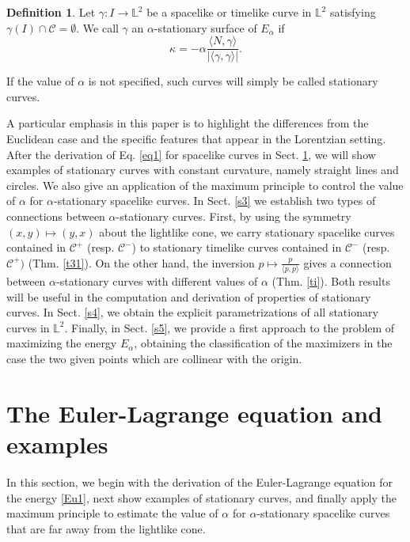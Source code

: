 \documentclass[a4paper,12pt]{amsart}
\theoremstyle{definition}
\newtheorem{definition}[theorem]{Definition}
\def\l{\mathbb L}
\begin{document}
\begin{definition} \label{d1}
Let $\gamma\colon I\to\l^2$ be a spacelike or timelike curve in $\l^2$ satisfying $\gamma(I) \cap \mathcal{C} = \emptyset$. We call $\gamma$ an $\alpha$-stationary surface of $E_\alpha$ if  
\begin{equation}
\kappa=-\alpha \frac{ \langle N,\gamma\rangle}{|\langle \gamma,\gamma\rangle|}. \label{eq1}
\end{equation}
\end{definition}
 
If the value of $\alpha$ is not specified, such curves will simply be called stationary curves.

A particular emphasis in this paper is to highlight the differences from the Euclidean case and the specific features that appear in the Lorentzian setting. After the derivation of Eq. \eqref{eq1} for spacelike curves in Sect. 
\ref{s2}, we will show examples of stationary curves  with constant curvature, namely straight lines and circles. 
We also give an application of the maximum principle to control the value of $\alpha$ for $\alpha$-stationary spacelike curves. 
 In Sect. \ref{s3} we establish two types of  connections between $\alpha$-stationary curves. First,  by using the symmetry $(x,y)\mapsto (y,x)$ about the lightlike cone, we carry stationary spacelike curves contained in $\mathcal{C}^+$ (resp. $\mathcal{C}^-$) to stationary timelike curves contained in $\mathcal{C}^-$ (resp. $\mathcal{C}^+)$ (Thm. \ref{t31}). On the other hand, the inversion $p\mapsto \frac{p}{\langle p,p\rangle}$ gives a connection between  $\alpha$-stationary curves with different values of $\alpha$ (Thm. \ref{ti}).  Both results will be useful in the computation and derivation of properties of  stationary curves. In   Sect. \ref{s4}, we obtain the  explicit parametrizations of all stationary curves in $\l^2$.   Finally, in Sect. \ref{s5}, we provide a first approach to the problem of maximizing the energy $E_\alpha$, obtaining the classification of the maximizers in the case the two given points which are collinear with the origin.  




 

\section{The Euler-Lagrange equation and examples}\label{s2}

In this section, we begin with the derivation of the Euler-Lagrange equation for the energy \eqref{Eu1}, next show examples of stationary curves, and finally apply the maximum principle to estimate the value of $\alpha$ for $\alpha$-stationary spacelike curves that are far away from the lightlike cone.  
\end{document}
